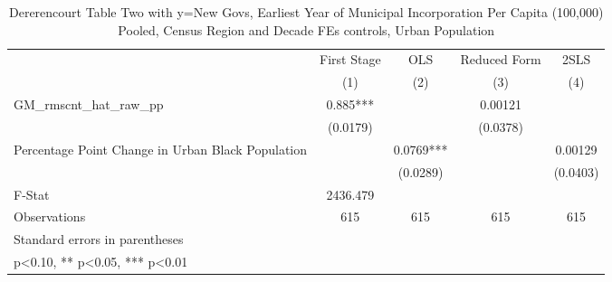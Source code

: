 \begin{table}[htbp]\centering
\def\sym#1{\ifmmode^{#1}\else\(^{#1}\)\fi}
\caption{Dererencourt Table Two with y=New Govs, Earliest Year of Municipal Incorporation Per Capita (100,000) Pooled, Census Region and Decade FEs controls, Urban Population}
\begin{tabular}{l*{4}{c}}
\toprule
                    & First Stage   &         OLS   &Reduced Form   &        2SLS   \\
                    &\multicolumn{1}{c}{(1)}   &\multicolumn{1}{c}{(2)}   &\multicolumn{1}{c}{(3)}   &\multicolumn{1}{c}{(4)}   \\
\midrule
GM\_rmscnt\_hat\_raw\_pp&       0.885***&               &     0.00121   &               \\
                    &    (0.0179)   &               &    (0.0378)   &               \\
\addlinespace
Percentage Point Change in Urban Black Population&               &      0.0769***&               &     0.00129   \\
                    &               &    (0.0289)   &               &    (0.0403)   \\
\midrule
F-Stat              &    2436.479   &               &               &               \\
Observations        &         615   &         615   &         615   &         615   \\
\bottomrule
\multicolumn{5}{l}{\footnotesize Standard errors in parentheses}\\
\multicolumn{5}{l}{\footnotesize * p<0.10, ** p<0.05, *** p<0.01}\\
\end{tabular}
\end{table}

